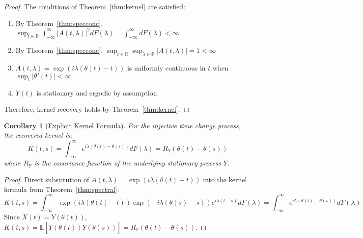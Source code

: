 \documentclass{article}
\newtheorem{corollary}{Corollary}
\newtheorem{proof}{Proof}
\begin{document}
\begin{proof}
The conditions of Theorem~\ref{thm:kernel} are satisfied:
\begin{enumerate}
\item By Theorem~\ref{thm:specconc}, $\sup_{t \in \mathbb{R}} \int_{-\infty}^{\infty} |A(t,\lambda)|^2 dF(\lambda) = \int_{-\infty}^{\infty} dF(\lambda) < \infty$
\item By Theorem~\ref{thm:specconc}, $\sup_{t \in \mathbb{R}} \sup_{\lambda \in \mathbb{R}} |A(t,\lambda)| = 1 < \infty$
\item $A(t,\lambda) = \exp(i\lambda(\theta(t) - t))$ is uniformly continuous in $t$ when $\sup_{t} |\theta'(t)| < \infty$
\item $Y(t)$ is stationary and ergodic by assumption
\end{enumerate}
Therefore, kernel recovery holds by Theorem~\ref{thm:kernel}.
\end{proof}

\begin{corollary}[Explicit Kernel Formula]\label{cor:explicit}
For the injective time change process, the recovered kernel is:
\[
K(t,s) = \int_{-\infty}^{\infty} e^{i\lambda(\theta(t) - \theta(s))} dF(\lambda) = R_Y(\theta(t) - \theta(s))
\]
where $R_Y$ is the covariance function of the underlying stationary process $Y$.
\end{corollary}

\begin{proof}
Direct substitution of $A(t,\lambda) = \exp(i\lambda(\theta(t) - t))$ into the kernel formula from Theorem~\ref{thm:spectral}:
\[
K(t,s) = \int_{-\infty}^{\infty} \exp(i\lambda(\theta(t) - t)) \exp(-i\lambda(\theta(s) - s)) e^{i\lambda(t-s)} dF(\lambda) = \int_{-\infty}^{\infty} e^{i\lambda(\theta(t) - \theta(s))} dF(\lambda)
\]
Since $X(t) = Y(\theta(t))$, $K(t,s) = \mathbb{E}[Y(\theta(t))\overline{Y(\theta(s))}] = R_Y(\theta(t) - \theta(s))$.
\end{proof}
\end{document}
